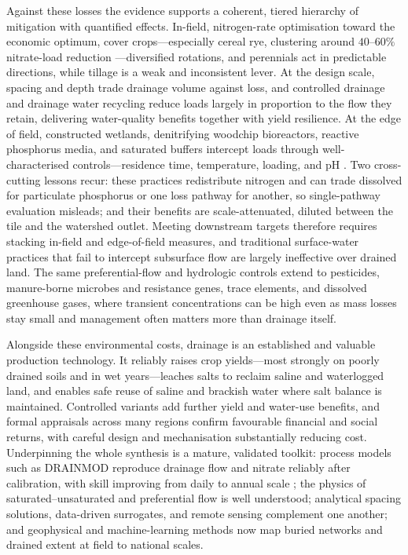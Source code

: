 Against these losses the evidence supports a coherent, tiered hierarchy of
mitigation with quantified effects. In-field, nitrogen-rate optimisation toward
the economic optimum, cover crops---especially cereal rye, clustering around
$40$--$60\%$ nitrate-load reduction \parencite{Malone2018,Malone2014b,Malone2023}---diversified rotations, and perennials act
in predictable directions, while tillage is a weak and inconsistent lever. At
the design scale, spacing and depth trade drainage volume against loss, and
controlled drainage and drainage water recycling reduce loads largely in
proportion to the flow they retain, delivering water-quality benefits together
with yield resilience. At the edge of field, constructed wetlands, denitrifying
woodchip bioreactors, reactive phosphorus media, and saturated buffers
intercept loads through well-characterised controls---residence time,
temperature, loading, and pH \parencite{Christianson2013,Jaynes2008}. Two cross-cutting lessons recur: these practices
redistribute nitrogen and can trade dissolved for particulate phosphorus or one
loss pathway for another, so single-pathway evaluation misleads; and their
benefits are scale-attenuated, diluted between the tile and the watershed
outlet. Meeting downstream targets therefore requires stacking in-field and
edge-of-field measures, and traditional surface-water practices that fail to
intercept subsurface flow are largely ineffective over drained land. The same
preferential-flow and hydrologic controls extend to pesticides, manure-borne
microbes and resistance genes, trace elements, and dissolved greenhouse gases,
where transient concentrations can be high even as mass losses stay small and
management often matters more than drainage itself.

Alongside these environmental costs, drainage is an established and valuable
production technology. It reliably raises crop yields---most strongly on poorly
drained soils and in wet years---leaches salts to reclaim saline and
waterlogged land, and enables safe reuse of saline and brackish water where salt
balance is maintained. Controlled variants add further yield and water-use
benefits, and formal appraisals across many regions confirm favourable
financial and social returns, with careful design and mechanisation
substantially reducing cost. Underpinning the whole synthesis is a mature,
validated toolkit: process models such as \textsc{DRAINMOD} reproduce drainage
flow and nitrate reliably after calibration, with skill improving from daily to
annual scale ; the physics of saturated--unsaturated and preferential flow is
well understood; analytical spacing solutions, data-driven surrogates, and
remote sensing complement one another; and geophysical and machine-learning
methods now map buried networks and drained extent at field to national scales.

